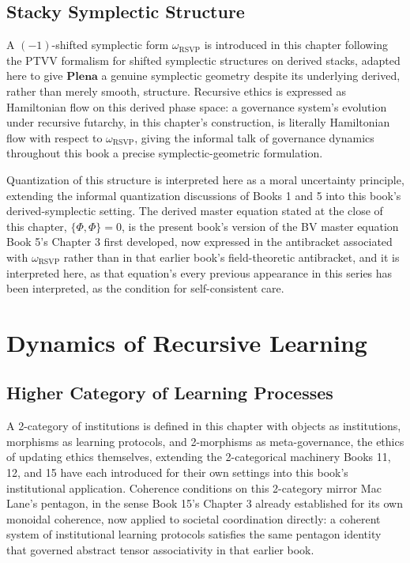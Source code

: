 \chapter{Stacky Symplectic Structure}

A $(-1)$-shifted symplectic form $\omega_{\mathrm{RSVP}}$ is introduced in this chapter following the PTVV formalism for shifted symplectic structures on derived stacks, adapted here to give $\mathbf{Plena}$ a genuine symplectic geometry despite its underlying derived, rather than merely smooth, structure. Recursive ethics is expressed as Hamiltonian flow on this derived phase space: a governance system's evolution under recursive futarchy, in this chapter's construction, is literally Hamiltonian flow with respect to $\omega_{\mathrm{RSVP}}$, giving the informal talk of governance dynamics throughout this book a precise symplectic-geometric formulation.

Quantization of this structure is interpreted here as a moral uncertainty principle, extending the informal quantization discussions of Books 1 and 5 into this book's derived-symplectic setting. The derived master equation stated at the close of this chapter, $\{\Phi, \Phi\} = 0$, is the present book's version of the BV master equation Book 5's Chapter 3 first developed, now expressed in the antibracket associated with $\omega_{\mathrm{RSVP}}$ rather than in that earlier book's field-theoretic antibracket, and it is interpreted here, as that equation's every previous appearance in this series has been interpreted, as the condition for self-consistent care.

\part{Dynamics of Recursive Learning}

\chapter{Higher Category of Learning Processes}

A 2-category of institutions is defined in this chapter with objects as institutions, morphisms as learning protocols, and 2-morphisms as meta-governance, the ethics of updating ethics themselves, extending the 2-categorical machinery Books 11, 12, and 15 have each introduced for their own settings into this book's institutional application. Coherence conditions on this 2-category mirror Mac Lane's pentagon, in the sense Book 15's Chapter 3 already established for its own monoidal coherence, now applied to societal coordination directly: a coherent system of institutional learning protocols satisfies the same pentagon identity that governed abstract tensor associativity in that earlier book.

